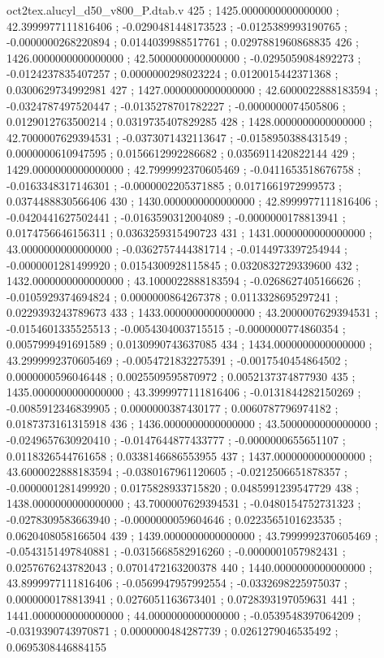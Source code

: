 \begin{filecontents}[overwrite]{oct2tex.alucyl_d50_v800_P.dtab.v}
425 ; 1425.0000000000000000 ; 42.3999977111816406 ; -0.0290481448173523 ; -0.0125389993190765 ; -0.0000000268220894 ; 0.0144039988517761 ; 0.0297881960868835
426 ; 1426.0000000000000000 ; 42.5000000000000000 ; -0.0295059084892273 ; -0.0124237835407257 ; 0.0000000298023224 ; 0.0120015442371368 ; 0.0300629734992981
427 ; 1427.0000000000000000 ; 42.6000022888183594 ; -0.0324787497520447 ; -0.0135278701782227 ; -0.0000000074505806 ; 0.0129012763500214 ; 0.0319735407829285
428 ; 1428.0000000000000000 ; 42.7000007629394531 ; -0.0373071432113647 ; -0.0158950388431549 ; 0.0000000610947595 ; 0.0156612992286682 ; 0.0356911420822144
429 ; 1429.0000000000000000 ; 42.7999992370605469 ; -0.0411653518676758 ; -0.0163348317146301 ; -0.0000002205371885 ; 0.0171661972999573 ; 0.0374488830566406
430 ; 1430.0000000000000000 ; 42.8999977111816406 ; -0.0420441627502441 ; -0.0163590312004089 ; -0.0000000178813941 ; 0.0174756646156311 ; 0.0363259315490723
431 ; 1431.0000000000000000 ; 43.0000000000000000 ; -0.0362757444381714 ; -0.0144973397254944 ; -0.0000001281499920 ; 0.0154300928115845 ; 0.0320832729339600
432 ; 1432.0000000000000000 ; 43.1000022888183594 ; -0.0268627405166626 ; -0.0105929374694824 ; 0.0000000864267378 ; 0.0113328695297241 ; 0.0229393243789673
433 ; 1433.0000000000000000 ; 43.2000007629394531 ; -0.0154601335525513 ; -0.0054304003715515 ; -0.0000000774860354 ; 0.0057999491691589 ; 0.0130990743637085
434 ; 1434.0000000000000000 ; 43.2999992370605469 ; -0.0054721832275391 ; -0.0017540454864502 ; 0.0000000596046448 ; 0.0025509595870972 ; 0.0052137374877930
435 ; 1435.0000000000000000 ; 43.3999977111816406 ; -0.0131844282150269 ; -0.0085912346839905 ; 0.0000000387430177 ; 0.0060787796974182 ; 0.0187373161315918
436 ; 1436.0000000000000000 ; 43.5000000000000000 ; -0.0249657630920410 ; -0.0147644877433777 ; -0.0000000655651107 ; 0.0118326544761658 ; 0.0338146686553955
437 ; 1437.0000000000000000 ; 43.6000022888183594 ; -0.0380167961120605 ; -0.0212506651878357 ; -0.0000001281499920 ; 0.0175828933715820 ; 0.0485991239547729
438 ; 1438.0000000000000000 ; 43.7000007629394531 ; -0.0480154752731323 ; -0.0278309583663940 ; -0.0000000059604646 ; 0.0223565101623535 ; 0.0620408058166504
439 ; 1439.0000000000000000 ; 43.7999992370605469 ; -0.0543151497840881 ; -0.0315668582916260 ; -0.0000001057982431 ; 0.0257676243782043 ; 0.0701472163200378
440 ; 1440.0000000000000000 ; 43.8999977111816406 ; -0.0569947957992554 ; -0.0332698225975037 ; 0.0000000178813941 ; 0.0276051163673401 ; 0.0728393197059631
441 ; 1441.0000000000000000 ; 44.0000000000000000 ; -0.0539548397064209 ; -0.0319390743970871 ; 0.0000000484287739 ; 0.0261279046535492 ; 0.0695308446884155

\end{filecontents}
